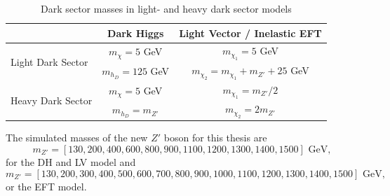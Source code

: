 \documentclass[12pt, a4paper]{book}
\begin{document}
\begin{table}[!h]
    \centering\caption{Dark sector masses in light- and heavy dark sector models}
    \begin{tabular}{l|c|c}\midrule\midrule
                                                                            & Dark Higgs            & Light Vector / Inelastic EFT              \\\midrule
        \multirow{2}{*}[-2\baselineskip]{Light Dark Sector}                 & $m_\chi = 5$ GeV      & $m_{\chi_1}= 5$ GeV                       \\
                                                                            & $m_{h_D} = 125$ GeV   & $m_{\chi_2}= m_{\chi_1}+m_{Z'} + 25$ GeV  \\\midrule
        \multirow{2}{*}[-2\baselineskip]{Heavy Dark Sector}                 & $m_\chi = 5$ GeV      & $m_{\chi_1}= m_{Z'}/2$                    \\
                                                                            & $m_{h_D} = m_{Z'}$    & $m_{\chi_2}= 2m_{Z'}$                     \\\midrule\midrule
    \end{tabular}
    \label{tab:DMass}
\end{table}
\newpage\noindent The simulated masses of the new $Z'$ boson for this thesis are
$$
m_{Z'} = [130, 200, 400, 600, 800, 900, 1100, 1200, 1300, 1400, 1500]\text{ GeV},
$$
for the DH and LV model and 
$$
m_{Z'} = [130, 200, 300, 400, 500, 600, 700, 800, 900, 1000, 1100, 1200, 1300, 1400, 1500]\text{ GeV},
$$
or the EFT model.
\end{document}
